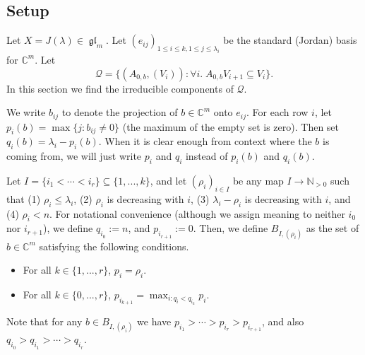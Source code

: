 \documentclass[12pt,psamsfonts]{article}
\DeclareMathOperator{\gl}{\mathfrak{gl}}
\begin{document}
\subsection{Setup}
Let \(X = J(\lambda) \in \gl_m\).
Let \((e_{ij})_{1 \leq i \leq k, 1 \leq j \leq \lambda_i}\) be the standard (Jordan) basis for \(\mathbb{C}^m\).
Let
\[\mathcal{Q} = \{(A_{0,b}, (V_i)) : \forall i. \; A_{0,b} V_{i + 1} \subseteq V_i\}.\]
In this section we find the irreducible components of \(\mathcal{Q}\).
\par We write \(b_{ij}\) to denote the projection of \(b \in \mathbb{C}^m\) onto \(e_{ij}\).
For each row \(i\), let \(p_i(b) = \max\{j : b_{ij} \neq 0\}\) (the maximum of the empty set is zero).
Then set \(q_i(b) = \lambda_i - p_i(b)\).
When it is clear enough from context where the \(b\) is coming from, we will just write \(p_i\) and \(q_i\) instead of \(p_i(b)\) and \(q_i(b)\).
\par Let \(I = \{i_1 < \cdots < i_r\} \subseteq \{1, ..., k\}\), and let \((\rho_i)_{i \in I}\) be any map \(I \to \mathbb{N}_{> 0}\) such that (1) \(\rho_i \leq \lambda_i\), (2) \(\rho_i\) is decreasing with \(i\), (3) \(\lambda_i - \rho_i\) is decreasing with \(i\), and (4) \(\rho_i < n\).
For notational convenience (although we assign meaning to neither \(i_0\) nor \(i_{r + 1}\)), we define \(q_{i_0} := n\), and \(p_{i_{r + 1}} := 0\).
Then, we define \(B_{I, (\rho_i)}\) as the set of \(b \in \mathbb{C}^m\) satisfying the following conditions.
\begin{itemize}
    \item For all \(k \in \{1, ..., r\}\), \(p_i = \rho_i\).
    \item For all \(k \in \{0, ..., r\}\), \(p_{i_{k + 1}} = \max_{i : q_i < q_{i_k}} p_i\).
\end{itemize}
Note that for any \(b \in B_{I, (\rho_i)}\) we have \(p_{i_1} > \cdots > p_{i_r} > p_{i_{r + 1}}\), and also \(q_{i_0} > q_{i_1} > \cdots > q_{i_r}\).
\end{document}
